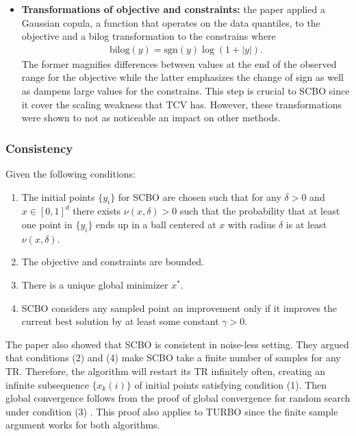 \begin{itemize}
    \item \textbf{Transformations of objective and constraints:} the paper applied a Gaussian copula, a function that operates on the data quantiles, to the objective and a bilog transformation to the constrains where
    \begin{align}
        \text{bilog}(y) = \text{sgn}(y)\log(1+|y|).
    \end{align}
    The former magnifies differences between values at the end of the observed range for the objective while the latter emphasizes the change of sign as well as dampens large values for the constrains. This step is crucial to SCBO since it cover the scaling weakness that TCV has. However, these transformations were shown to not as noticeable an impact on other methods.
\end{itemize}
\subsubsection{Consistency}
Given the following conditions:
\begin{enumerate}
    \item The initial points $\{y_i\}$ for SCBO are chosen such that for any $\delta>0$ and $x \in [0, 1]^d$ there exists $\nu(x, \delta) > 0$ such that the probability that at least one point in $\{y_i\}$ ends up in a ball centered at $x$ with radius $\delta$ is at least $\nu(x, \delta)$.
    \item  The objective and constraints are bounded.
    \item  There is a unique global minimizer $x^*$.
    \item  SCBO considers any sampled point an improvement only if it improves the current best solution by at least some constant $\gamma > 0$.
\end{enumerate}
The paper also showed that SCBO is consistent in noise-less setting. They argued that conditions (2) and (4) make SCBO take a finite number of samples for any TR. Therefore, the algorithm will restart its TR infinitely often, creating an infinite subsequence $\{x_k(i)\}$ of initial points satisfying condition (1). Then global convergence follows from the proof of global convergence for random search under condition (3) \cite{spall2005introduction}. This proof also applies to TURBO since the finite sample argument works for both algorithms.

